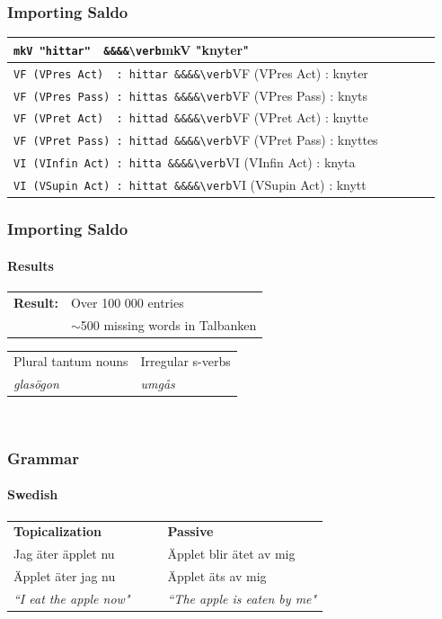 \documentclass[10pt]{beamer}
\begin{document}
\begin{frame}
\frametitle{Importing Saldo}
\begin{tabular} [t]{@{}*{5}{l@{\ }}}
\verb-mkV "hittar"  &&&&\verb-mkV "knyter" \\
\hline
\vspace{-2mm}
\hspace{-3mm}
\verb-VF (VPres Act)  : hittar &&&&\verb-VF (VPres Act)  : knyter\\
\vspace{-2mm}
\hspace{-3mm}
\verb-VF (VPres Pass) : hittas &&&&\verb-VF (VPres Pass)  : knyts\\   
\vspace{-2mm}
\hspace{-3mm}
\verb-VF (VPret Act)  : hittad &&&&\verb-VF (VPret Act)  : knytte\\
\vspace{-2mm}
\hspace{-3mm}
\verb-VF (VPret Pass) : hittad &&&&\verb-VF (VPret Pass)  : knyttes\\ 
\vspace{-2mm}
\hspace{-3mm}
\verb-VI (VInfin Act) : hitta &&&&\verb-VI (VInfin Act)  : knyta\\
\vspace{-2mm}
\hspace{-3mm}
\verb-VI (VSupin Act) : hittat &&&&\verb-VI (VSupin Act) : knytt\\
\end{tabular}
\end{frame}


\begin{frame}
\frametitle{Importing Saldo}
\framesubtitle{Results} 
\vspace{5mm}
\begin{tabular}{ll}
\textbf{Result:} & Over 100 000 entries\\
\pause
&$\sim$500 missing words in Talbanken\\
\end{tabular}
\begin{tabular}{ll}
Plural tantum nouns & Irregular s-verbs \\
\emph{glasögon} & \emph{umgås}\\
\end{tabular}\\
\end{frame}

\begin{frame}
\frametitle{Grammar}
\framesubtitle{Swedish} 
\begin{tabular}{llll}
\textbf{Topicalization}& && \textbf{Passive}\\
Jag äter äpplet nu && &Äpplet blir ätet av mig \\
Äpplet äter jag nu &&& Äpplet äts av mig \\
\emph{``I eat the apple now"}& &&\emph{``The apple is eaten by me"}\\
\end{tabular}
\end{frame}
\end{document}
